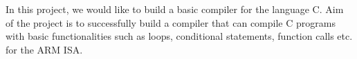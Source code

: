 In this project, we would like to build a basic compiler for the 
language C. Aim of the project is to successfully build a compiler 
that can compile C programs with basic functionalities such as loops, 
conditional statements, function calls etc. for the ARM ISA.